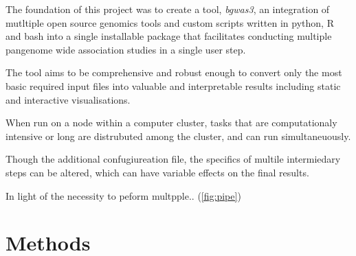 \documentclass[]{DissertateUSU}
\begin{document}
The foundation of this project was to create a tool, \emph{bgwas3}, an
integration of mutltiple open source genomics tools and custom scripts
written in python, R and bash into a single installable package that
facilitates conducting multiple pangenome wide association studies in a
single user step.

The tool aims to be comprehensive and robust enough to convert only the
most basic required input files into valuable and interpretable results
including static and interactive visualisations.

When run on a node within a computer cluster, tasks that are
computationaly intensive or long are distrubuted among the cluster, and
can run simultaneuously.

Though the additional confugiureation file, the specifics of multile
intermiedary steps can be altered, which can have variable effects on
the final results.

In light of the necessity to peform multpple.. (\ref{fig:pipe})

\hypertarget{methods}{%
\section{Methods}\label{methods}}
\end{document}
